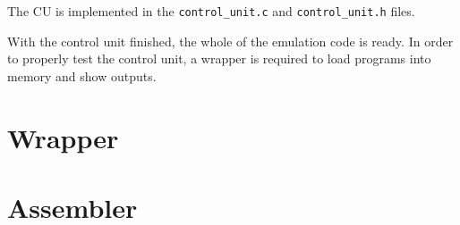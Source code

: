 \documentclass[a4paper]{article}
\begin{document}
The CU is implemented in the \verb|control_unit.c| and \verb|control_unit.h| files.

With the control unit finished, the whole of the emulation code is ready. In order to properly test the control unit, a wrapper is required to load programs into memory and show outputs.

\section{Wrapper}

\section{Assembler}
\end{document}
